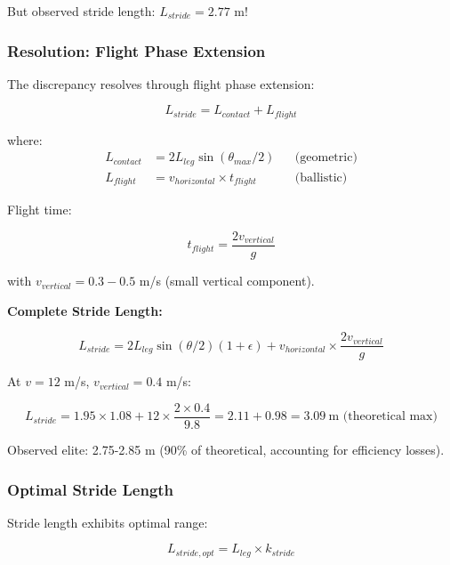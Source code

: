 But observed stride length: $L_{stride} = 2.77$ m!

\subsubsection{Resolution: Flight Phase Extension}

The discrepancy resolves through flight phase extension:

\begin{equation}
L_{stride} = L_{contact} + L_{flight}
\label{eq:stride_decomposition}
\end{equation}

where:
\begin{align}
L_{contact} &= 2 L_{leg} \sin(\theta_{max}/2) && \text{(geometric)} \\
L_{flight} &= v_{horizontal} \times t_{flight} && \text{(ballistic)}
\end{align}

Flight time:

\begin{equation}
t_{flight} = \frac{2 v_{vertical}}{g}
\label{eq:flight_time}
\end{equation}

with $v_{vertical} = 0.3-0.5$ m/s (small vertical component).

\textbf{Complete Stride Length:}

\begin{equation}
L_{stride} = 2 L_{leg} \sin(\theta/2) (1+\epsilon) + v_{horizontal} \times \frac{2v_{vertical}}{g}
\label{eq:complete_stride_length}
\end{equation}

At $v = 12$ m/s, $v_{vertical} = 0.4$ m/s:

\begin{equation}
L_{stride} = 1.95 \times 1.08 + 12 \times \frac{2 \times 0.4}{9.8} = 2.11 + 0.98 = 3.09~\text{m (theoretical max)}
\label{eq:theoretical_max_stride}
\end{equation}

Observed elite: 2.75-2.85 m (90\% of theoretical, accounting for efficiency losses).

\subsubsection{Optimal Stride Length}

Stride length exhibits optimal range:

\begin{equation}
L_{stride,opt} = L_{leg} \times k_{stride}
\label{eq:optimal_stride}
\end{equation}

